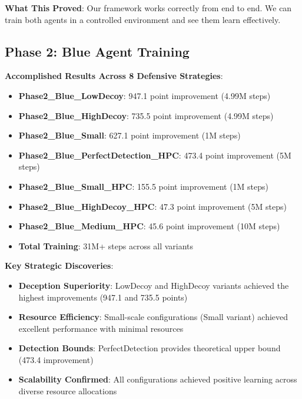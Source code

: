 \documentclass[11pt]{article}
\begin{document}
\begin{intuition}
\textbf{What This Proved}: Our framework works correctly from end to end. We can train both agents in a controlled environment and see them learn effectively.

\subsection{Phase 2: Blue Agent Training}
\begin{example}
\textbf{Accomplished Results Across 8 Defensive Strategies}:
\begin{itemize}
\item \textbf{Phase2\_Blue\_LowDecoy}: 947.1 point improvement (4.99M steps)
\item \textbf{Phase2\_Blue\_HighDecoy}: 735.5 point improvement (4.99M steps)
\item \textbf{Phase2\_Blue\_Small}: 627.1 point improvement (1M steps)
\item \textbf{Phase2\_Blue\_PerfectDetection\_HPC}: 473.4 point improvement (5M steps)
\item \textbf{Phase2\_Blue\_Small\_HPC}: 155.5 point improvement (1M steps)
\item \textbf{Phase2\_Blue\_HighDecoy\_HPC}: 47.3 point improvement (5M steps)
\item \textbf{Phase2\_Blue\_Medium\_HPC}: 45.6 point improvement (10M steps)
\item \textbf{Total Training}: 31M+ steps across all variants
\end{itemize}
\end{example}

\begin{mathdetails}
\textbf{Key Strategic Discoveries}:
\begin{itemize}
\item \textbf{Deception Superiority}: LowDecoy and HighDecoy variants achieved the highest improvements (947.1 and 735.5 points)
\item \textbf{Resource Efficiency}: Small-scale configurations (Small variant) achieved excellent performance with minimal resources
\item \textbf{Detection Bounds}: PerfectDetection provides theoretical upper bound (473.4 improvement)
\item \textbf{Scalability Confirmed}: All configurations achieved positive learning across diverse resource allocations
\end{itemize}
\end{mathdetails}


\end{intuition}
\end{document}
